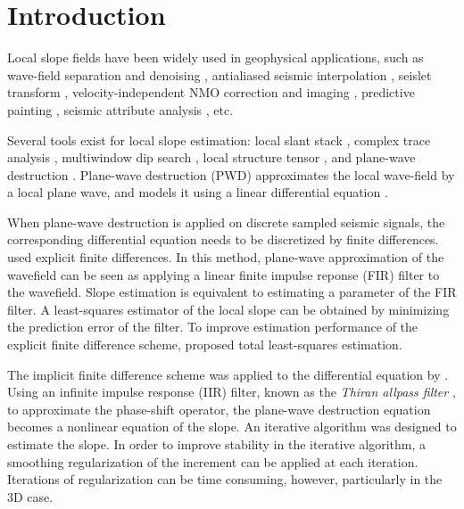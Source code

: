 \section{Introduction}

Local slope fields have been widely used
in geophysical applications,
such as wave-field separation and denoising \cite[]{harlan:1869,fomel:U89},
antialiased seismic interpolation \cite[]{GPR:GPR343},
seislet transform \cite[]{fomel:V25},
velocity-independent NMO correction and imaging \cite[]{fomel:S139,cooke:WCA65},
predictive painting \cite[]{fomel:A25},
seismic attribute analysis \cite[]{marfurt:104}, etc.

Several tools exist for local slope estimation:
local slant stack \cite[]{ottolini1983signal,harlan:1869},
complex trace analysis \cite[]{barnes:264},
multiwindow dip search \cite[]{marfurt:P29},
local structure tensor \cite[]{fehmers:1286,halelocal},
and plane-wave destruction \cite[]{claerbout1992earth,fomel:1946}.
Plane-wave destruction (PWD) approximates 
the local wave-field by a local plane wave,
and models it using a linear differential equation \cite[]{claerbout1992earth}.

When plane-wave destruction is applied on discrete sampled seismic signals, 
the corresponding differential equation needs to be discretized by finite differences.
\cite{claerbout1992earth} used explicit finite differences.
In this method, plane-wave approximation of the wavefield can be seen as 
applying a linear finite impulse reponse (FIR) filter to the wavefield.
Slope estimation is equivalent to estimating a parameter of the FIR filter.
A least-squares estimator of the local slope can be obtained 
by minimizing the prediction error of the filter.
To improve estimation performance of the explicit finite difference scheme,
\cite{schleicher:P25} proposed total least-squares estimation.

The implicit finite difference scheme was applied to 
the differential equation by \cite{fomel:1946}.
Using an infinite impulse response (IIR) filter,
known as the \textit{Thiran allpass filter} 
\cite[]{thiran1971recursive},
to approximate the phase-shift operator,
the plane-wave destruction equation becomes
a nonlinear equation of the slope.
An iterative algorithm was designed to estimate the slope.
In order to improve stability in the iterative algorithm,
a smoothing regularization \cite[]{fomel:R29} of the increment 
can be applied at each iteration.
Iterations of regularization can be time consuming, 
however, particularly in the 3D case.

